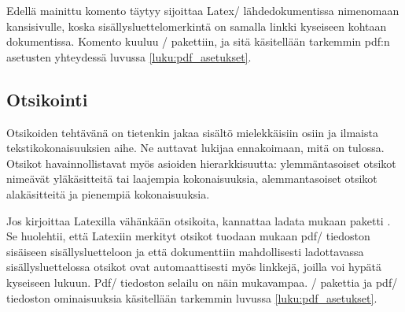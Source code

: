 \begin{koodilohkosis}
\end{koodilohkosis}

Edellä mainittu komento  täytyy sijoittaa Latex\-/
lähdedokumentissa nimenomaan kansisivulle, koska
sisällysluettelomerkintä on samalla linkki kyseiseen kohtaan
dokumentissa. Komento kuuluu \-/ pakettiin, ja sitä
käsitellään tarkemmin pdf:n asetusten yhteydessä luvussa
\ref{luku:pdf_asetukset}.

\subsection{Otsikointi}
\label{luku:otsikot}

Otsikoiden tehtävänä on tietenkin jakaa sisältö mielekkäisiin osiin ja
ilmaista tekstikokonaisuuksien aihe. Ne auttavat lukijaa ennakoimaan,
mitä on tulossa. Otsikot havainnollistavat myös asioiden
hierarkkisuutta: ylemmäntasoiset otsikot nimeävät yläkäsitteitä tai
laajempia kokonaisuuksia, alemmantasoiset otsikot alakäsitteitä ja
pienempiä kokonaisuuksia.

Jos kirjoittaa Latexilla vähänkään otsikoita, kannattaa ladata mukaan
paketti . Se huolehtii, että Latexiin merkityt otsikot
tuodaan mukaan pdf\-/ tiedoston sisäiseen sisällysluetteloon ja että
dokumenttiin mahdollisesti ladottavassa sisällysluettelossa otsikot ovat
automaattisesti myös linkkejä, joilla voi hypätä kyseiseen lukuun.
Pdf\-/ tiedoston selailu on näin mukavampaa. \-/
pakettia ja pdf\-/ tiedoston ominaisuuksia käsitellään tarkemmin luvussa
\ref{luku:pdf_asetukset}.


